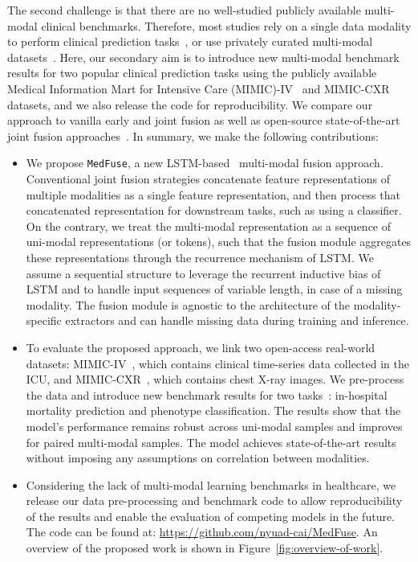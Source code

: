 \documentclass[pmlr]{jmlr}
\begin{document}
The second challenge is that there are no well-studied publicly available multi-modal clinical benchmarks. Therefore, most studies rely on a single data modality to perform clinical prediction tasks~\citep{benchhmark}, or use privately curated multi-modal datasets~\citep{Huang2020_survey}. Here, our secondary aim is to introduce new multi-modal benchmark results for two popular clinical prediction tasks using the publicly available Medical Information Mart for Intensive Care (MIMIC)-IV~\citep{mimic4} and MIMIC-CXR~\citep{mimiccxrjpg} datasets, and we also release the code for reproducibility. We compare our approach to vanilla early and joint fusion as well as open-source state-of-the-art joint fusion approaches~\citep{vaezi20mmtm,daft}. In summary, we make the following contributions:
\begin{itemize}
\item We propose \texttt{MedFuse}, a new LSTM-based~\citep{hochreiter1997long} multi-modal fusion approach. Conventional joint fusion strategies concatenate feature representations of multiple modalities as a single feature representation, and then process that concatenated representation for downstream tasks, such as using a classifier. On the contrary, we treat the multi-modal representation as a sequence of uni-modal representations (or tokens), such that the fusion module aggregates these representations through the recurrence mechanism of LSTM. We assume a sequential structure to leverage the recurrent inductive bias of LSTM and to handle input sequences of variable length, in case of a missing modality. The fusion module is agnostic to the architecture of the modality-specific extractors and can handle missing data during training and inference.
\item To evaluate the proposed approach, we link two open-access real-world datasets: MIMIC-IV~\citep{mimic4}, which contains clinical time-series data collected in the ICU, and MIMIC-CXR~\citep{mimiccxrjpg}, which contains chest X-ray images. We pre-process the data and introduce new benchmark results for two tasks~\citep{benchhmark}: in-hospital mortality prediction and phenotype classification. The results show that the model's performance remains robust across uni-modal samples and improves for paired multi-modal samples. The model achieves state-of-the-art results without imposing any assumptions on correlation between modalities.
\item Considering the lack of multi-modal learning benchmarks in healthcare, we release our data pre-processing and benchmark code to allow reproducibility of the results and enable the evaluation of competing models in the future. The code can be found at: \url{https://github.com/nyuad-cai/MedFuse}. An overview of the proposed work is shown in Figure~\ref{fig:overview-of-work}.
\end{itemize}
\end{document}
